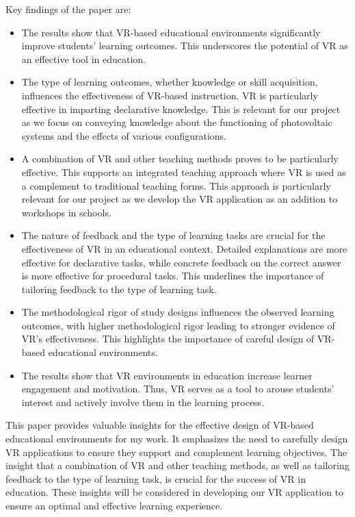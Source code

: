 \documentclass[draft, final]{vutinfth} %
\begin{document}
Key findings of the paper are:
\begin{itemize}
  \item The results show that VR-based educational environments significantly improve students' learning outcomes. This underscores the potential of VR as an effective tool in education.

  \item The type of learning outcomes, whether knowledge or skill acquisition, influences the effectiveness of VR-based instruction. VR is particularly effective in imparting declarative knowledge. This is relevant for our project as we focus on conveying knowledge about the functioning of photovoltaic systems and the effects of various configurations.

  \item A combination of VR and other teaching methods proves to be particularly effective. This supports an integrated teaching approach where VR is used as a complement to traditional teaching forms. This approach is particularly relevant for our project as we develop the VR application as an addition to workshops in schools.

  \item The nature of feedback and the type of learning tasks are crucial for the effectiveness of VR in an educational context. Detailed explanations are more effective for declarative tasks, while concrete feedback on the correct answer is more effective for procedural tasks. This underlines the importance of tailoring feedback to the type of learning task.

  \item The methodological rigor of study designs influences the observed learning outcomes, with higher methodological rigor leading to stronger evidence of VR's effectiveness. This highlights the importance of careful design of VR-based educational environments.

  \item The results show that VR environments in education increase learner engagement and motivation. Thus, VR serves as a tool to arouse students' interest and actively involve them in the learning process.
\end{itemize}

This paper provides valuable insights for the effective design of VR-based educational environments for my work. It emphasizes the need to carefully design VR applications to ensure they support and complement learning objectives. The insight that a combination of VR and other teaching methods, as well as tailoring feedback to the type of learning task, is crucial for the success of VR in education. These insights will be considered in developing our VR application to ensure an optimal and effective learning experience.
\end{document}
